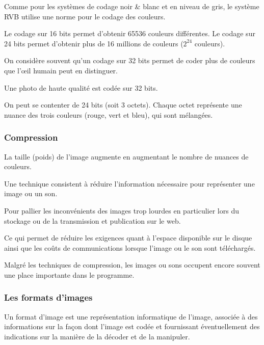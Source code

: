 \documentclass[11pt, a4paper]{book}
\begin{document}
Comme pour les systèmes de codage noir \& blanc et en niveau de gris, le système RVB utilise une norme pour le codage des couleurs. 

Le codage sur 16 bits permet d'obtenir 65536 couleurs différentes. 
Le codage sur 24 bits permet d'obtenir plus de 16 millions de couleurs ($2^{24}$ couleurs).

On considère souvent qu'un codage sur 32 bits permet de coder plus de couleurs que l’œil humain peut en distinguer.

Une photo de haute qualité est codée sur 32 bits.

On peut se contenter de 24 bits (soit 3 octets). Chaque octet représente une nuance des trois couleurs (rouge, vert et bleu), qui sont mélangées.

\subsubsection{Compression}

\begin{remarque}
La taille (poids) de l’image augmente en augmentant le nombre de nuances de couleurs.
\end{remarque}


Une technique consistent à réduire l’information nécessaire pour représenter une image ou un son.

Pour pallier les inconvénients des images trop lourdes en particulier lors du stockage ou de la transmission et publication sur le web.

Ce qui permet de réduire les exigences quant à l’espace disponible sur le disque ainsi que les coûts de communications lorsque l’image ou le son sont téléchargés.


Malgré les techniques de compression, les images ou sons occupent encore souvent une place importante dans le programme.

\subsubsection{Les formats d'images}

\begin{defi}
Un format d'image est une représentation informatique de l'image, associée à des informations sur la façon dont l'image est codée et fournissant éventuellement des indications sur la manière de la décoder et de la manipuler.
\end{defi}
\end{document}
